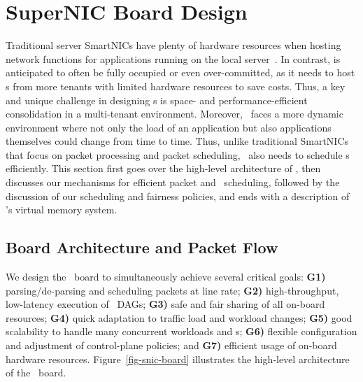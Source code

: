 \section{SuperNIC Board Design}
\label{sec:snic:design}



Traditional server SmartNICs have plenty of hardware resources when hosting network functions for applications running on the local server~\cite{SmartNIC-nsdi18,Caulfield-2018}.
In contrast, \snic{} is anticipated to often be fully occupied or even over-committed, as it needs to host \nt{}s from more tenants with limited hardware resources to save costs.
Thus, a key and unique challenge in designing \snic{}s is space- and performance-efficient consolidation in a multi-tenant environment.
Moreover, \snic\ faces a more dynamic environment where not only the load of an application but also applications themselves could change from time to time.
Thus, unlike traditional SmartNICs that focus on packet processing and packet scheduling, \snic\ also needs to schedule \nt{}s efficiently.
This section first goes over the high-level architecture of \snic, then discusses our mechanisms for efficient packet and \nt\ scheduling, followed by the discussion of our scheduling and fairness policies, and ends with a description of \snic's virtual memory system.

\subsection{Board Architecture and Packet Flow}

We design the \snic\ board to simultaneously achieve several critical goals:
\textbf{G1)} parsing/de-parsing and scheduling packets at line rate;
\textbf{G2)} high-throughput, low-latency execution of \nt\ DAGs;
\textbf{G3)} safe and fair sharing of all on-board resources;
\textbf{G4)} quick adaptation to traffic load and workload changes;
\textbf{G5)} good scalability to handle many concurrent workloads and \nt{}s;
\textbf{G6)} flexible configuration and adjustment of control-plane policies;
and \textbf{G7)} efficient usage of on-board hardware resources.
Figure~\ref{fig-snic-board} illustrates the high-level architecture of the \snic\ board.

